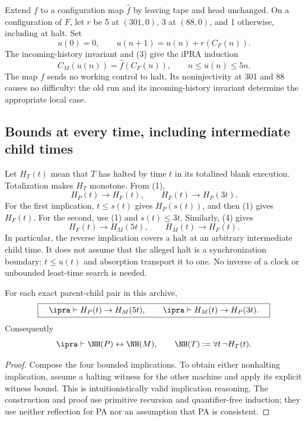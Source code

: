 Extend $f$ to a configuration map $\widehat f$ by leaving tape and head
unchanged. On a configuration of $F$, let $r$ be 5 at $(301,0)$, 3 at
$(88,0)$, and 1 otherwise, including at halt. Set
\[
 u(0)=0,\qquad u(n+1)=u(n)+r(C_F(n)).
\]
The incoming-history invariant and (3) give the iPRA induction
\[
 C_M(u(n))=\widehat f(C_F(n)),\qquad
 n\le u(n)\le5n.\tag{4}
\]
The map $f$ sends no working control to halt. Its noninjectivity at
301 and 88 causes no difficulty: the old run and its incoming-history
invariant determine the appropriate local case.

\subsection{Bounds at every time, including intermediate child times}
Let $H_T(t)$ mean that $T$ has halted by time $t$ in its totalized blank
execution. Totalization makes $H_T$ monotone. From (1),
\[
 H_P(t)\to H_F(t),\qquad H_F(t)\to H_P(3t).
\]
For the first implication, $t\le s(t)$ gives $H_P(s(t))$, and then (1)
gives $H_F(t)$. For the second, use (1) and $s(t)\le3t$.
Similarly, (4) gives
\[
 H_F(t)\to H_M(5t),\qquad H_M(t)\to H_F(t).
\]
In particular, the reverse implication covers a halt at an arbitrary
intermediate child time. It does not assume that the alleged halt is a
synchronization boundary: $t\le u(t)$ and absorption transport it to one.
No inverse of a clock or unbounded least-time search is needed.

\begin{theorem}
\label{thm:relative}
For each exact parent-child pair in this archive,
\[
 \boxed{\quad
 \ipra\vdash H_P(t)\to H_M(5t),\qquad
 \ipra\vdash H_M(t)\to H_P(3t).
 \quad}
\]
Consequently
\[
 \ipra\vdash\NH(P)\leftrightarrow\NH(M),
 \qquad\NH(T):=\forall t\,\neg H_T(t).
\]
\end{theorem}
\begin{proof}
Compose the four bounded implications. To obtain either nonhalting
implication, assume a halting witness for the other machine and apply its
explicit witness bound. This is intuitionistically valid implication
reasoning. The construction and proof use primitive recursion and
quantifier-free induction; they use neither reflection for PA nor an
assumption that PA is consistent.
\end{proof}
